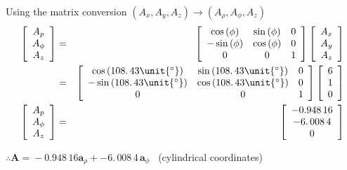 \documentclass{article}
\begin{document}
Using the matrix conversion $\left( A_{x},A_{y},A_{z}\right) \longrightarrow
\left( A_{\rho },A_{\phi },A_{z}\right) $ 
\begin{eqnarray*}
\left[ 
\begin{array}{c}
A_{p} \\ 
A_{\phi } \\ 
A_{z}%
\end{array}%
\right] &=&\left[ 
\begin{array}{ccc}
\cos \left( \phi \right) & \sin \left( \phi \right) & 0 \\ 
-\sin \left( \phi \right) & \cos \left( \phi \right) & 0 \\ 
0 & 0 & 1%
\end{array}%
\right] \left[ 
\begin{array}{c}
A_{x} \\ 
A_{y} \\ 
A_{z}%
\end{array}%
\right] \\
&=&\left[ 
\begin{array}{ccc}
\cos \left( 108.\,\allowbreak 43\unit{%
{{}^\circ}%
}\right) & \sin \left( 108.\,\allowbreak 43\unit{%
{{}^\circ}%
}\right) & 0 \\ 
-\sin \left( 108.\,\allowbreak 43\unit{%
{{}^\circ}%
}\right) & \cos \left( 108.\,\allowbreak 43\unit{%
{{}^\circ}%
}\right) & 0 \\ 
0 & 0 & 1%
\end{array}%
\right] \left[ 
\begin{array}{c}
6 \\ 
1 \\ 
0%
\end{array}%
\right] \\
\left[ 
\begin{array}{c}
A_{p} \\ 
A_{\phi } \\ 
A_{z}%
\end{array}%
\right] &=&\left[ 
\begin{array}{c}
-0.948\,16 \\ 
-6.\,\allowbreak 008\,4 \\ 
0%
\end{array}%
\right] \allowbreak
\end{eqnarray*}

$\therefore \mathbf{A=}-0.948\,16\mathbf{a}_{\rho }+-6.\,\allowbreak 008\,4\,%
\mathbf{a}_{\phi }$ ~(cylindrical coordinates)
\end{document}
